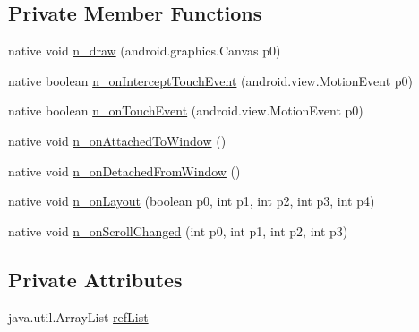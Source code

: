 \subsection*{Private Member Functions}
\begin{CompactItemize}
\item 
native void \hyperlink{classmd5b60ffeb829f638581ab2bb9b1a7f4f3f_1_1_scroll_view_renderer_7596ebe0714b10e6b5917ecfb0a52f51}{n\_\-draw} (android.graphics.Canvas p0)
\item 
native boolean \hyperlink{classmd5b60ffeb829f638581ab2bb9b1a7f4f3f_1_1_scroll_view_renderer_ef12a8bfcc86a2321c6b2affa8cbe2ee}{n\_\-onInterceptTouchEvent} (android.view.MotionEvent p0)
\item 
native boolean \hyperlink{classmd5b60ffeb829f638581ab2bb9b1a7f4f3f_1_1_scroll_view_renderer_62eb6d326ae4fcd7d9730dd8600c9ace}{n\_\-onTouchEvent} (android.view.MotionEvent p0)
\item 
native void \hyperlink{classmd5b60ffeb829f638581ab2bb9b1a7f4f3f_1_1_scroll_view_renderer_1ada2556ed1249686076a92c1d9bc70c}{n\_\-onAttachedToWindow} ()
\item 
native void \hyperlink{classmd5b60ffeb829f638581ab2bb9b1a7f4f3f_1_1_scroll_view_renderer_eb36115da7b8f42b18b82a73bd3905bc}{n\_\-onDetachedFromWindow} ()
\item 
native void \hyperlink{classmd5b60ffeb829f638581ab2bb9b1a7f4f3f_1_1_scroll_view_renderer_f028092f84bfc2747d8a55eacd9e833a}{n\_\-onLayout} (boolean p0, int p1, int p2, int p3, int p4)
\item 
native void \hyperlink{classmd5b60ffeb829f638581ab2bb9b1a7f4f3f_1_1_scroll_view_renderer_b9747abe611665b03334315d01f64462}{n\_\-onScrollChanged} (int p0, int p1, int p2, int p3)
\end{CompactItemize}
\subsection*{Private Attributes}
\begin{CompactItemize}
\item 
java.util.ArrayList \hyperlink{classmd5b60ffeb829f638581ab2bb9b1a7f4f3f_1_1_scroll_view_renderer_abea0e84f8655032f0b5e1be5a0da571}{refList}
\end{CompactItemize}


